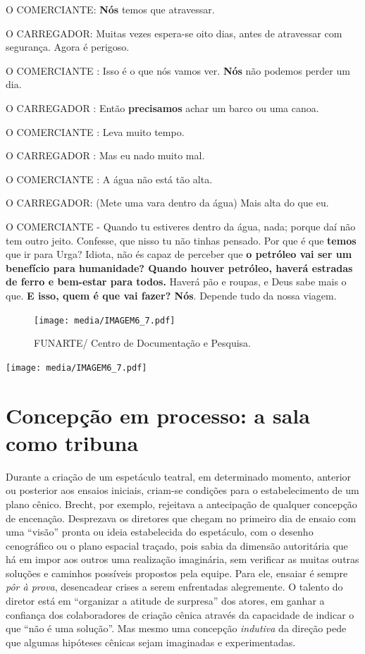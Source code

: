 O COMERCIANTE: \textbf{Nós} temos que atravessar.

O CARREGADOR: Muitas vezes espera-se oito dias, antes de atravessar com
segurança. Agora é perigoso.

O COMERCIANTE : Isso é o que nós vamos ver. \textbf{Nós} não podemos perder
um dia.

O CARREGADOR : Então \textbf{precisamos} achar um barco ou uma canoa.

O COMERCIANTE : Leva muito tempo.

O CARREGADOR : Mas eu nado muito mal.

O COMERCIANTE : A água não está tão alta.

O CARREGADOR: (Mete uma vara dentro da água) Mais alta do que eu.

O COMERCIANTE - Quando tu estiveres dentro da água, nada; porque daí não
tem outro jeito. Confesse, que nisso tu não tinhas pensado. Por que é
que \textbf{temos} que ir para Urga? Idiota, não és capaz de perceber que
\textbf{o petróleo vai ser um benefício para humanidade? Quando houver
petróleo, haverá estradas de ferro e bem-estar para todos.} Haverá pão e
roupas, e Deus sabe mais o que. \textbf{E isso, quem é que vai fazer? Nós}.
Depende tudo da nossa viagem.

\begin{figure}
\texttt{[image: media/IMAGEM6\_7.pdf]}
\caption{FUNARTE/ Centro de Documentação e Pesquisa.}
\end{figure}

\texttt{[image: media/IMAGEM6\_7.pdf]}

\section{Concepção em processo: a sala como tribuna}

Durante a criação de um espetáculo teatral, em determinado momento,
anterior ou posterior aos ensaios iniciais, criam-se condições para o
estabelecimento de um plano cênico. Brecht, por exemplo, rejeitava a
antecipação de qualquer concepção de encenação. Desprezava os diretores
que chegam no primeiro dia de ensaio com uma “visão” pronta ou ideia
estabelecida do espetáculo, com o desenho cenográfico ou o plano
espacial traçado, pois sabia da dimensão autoritária que há em impor aos
outros uma realização imaginária, sem verificar as muitas outras
soluções e caminhos possíveis propostos pela equipe. Para ele, ensaiar é
sempre \textit{pôr à prova}, desencadear crises a serem enfrentadas
alegremente. O talento do diretor está em “organizar a atitude de
surpresa” dos atores, em ganhar a confiança dos colaboradores de criação
cênica através da capacidade de indicar o que “não é uma solução”. Mas
mesmo uma concepção \textit{indutiva} da direção pede que algumas hipóteses
cênicas sejam imaginadas e experimentadas.

